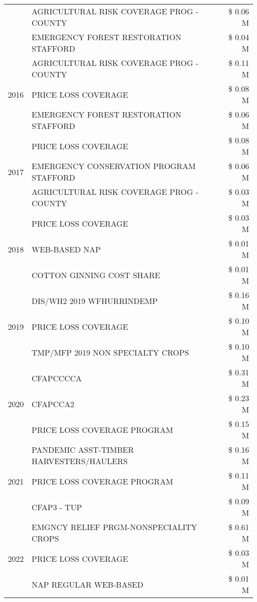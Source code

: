 \begin{tabular}{llr}
 & AGRICULTURAL RISK COVERAGE PROG - COUNTY & \$ 0.06 M \\
 & EMERGENCY FOREST RESTORATION STAFFORD & \$ 0.04 M \\
\cline{1-3}
\multirow[t]{3}{*}{2016} & AGRICULTURAL RISK COVERAGE PROG - COUNTY & \$ 0.11 M \\
 & PRICE LOSS COVERAGE & \$ 0.08 M \\
 & EMERGENCY FOREST RESTORATION STAFFORD & \$ 0.06 M \\
\cline{1-3}
\multirow[t]{3}{*}{2017} & PRICE LOSS COVERAGE & \$ 0.08 M \\
 & EMERGENCY CONSERVATION PROGRAM STAFFORD & \$ 0.06 M \\
 & AGRICULTURAL RISK COVERAGE PROG - COUNTY & \$ 0.03 M \\
\cline{1-3}
\multirow[t]{3}{*}{2018} & PRICE LOSS COVERAGE & \$ 0.03 M \\
 & WEB-BASED NAP & \$ 0.01 M \\
 & COTTON GINNING COST SHARE & \$ 0.01 M \\
\cline{1-3}
\multirow[t]{3}{*}{2019} & DIS/WH2 2019 WFHURRINDEMP & \$ 0.16 M \\
 & PRICE LOSS COVERAGE & \$ 0.10 M \\
 & TMP/MFP 2019 NON SPECIALTY CROPS & \$ 0.10 M \\
\cline{1-3}
\multirow[t]{3}{*}{2020} & CFAPCCCCA & \$ 0.31 M \\
 & CFAPCCA2 & \$ 0.23 M \\
 & PRICE LOSS COVERAGE PROGRAM & \$ 0.15 M \\
\cline{1-3}
\multirow[t]{3}{*}{2021} & PANDEMIC ASST-TIMBER HARVESTERS/HAULERS & \$ 0.16 M \\
 & PRICE LOSS COVERAGE PROGRAM & \$ 0.11 M \\
 & CFAP3 - TUP & \$ 0.09 M \\
\cline{1-3}
\multirow[t]{3}{*}{2022} & EMGNCY RELIEF PRGM-NONSPECIALITY CROPS & \$ 0.61 M \\
 & PRICE LOSS COVERAGE & \$ 0.03 M \\
 & NAP REGULAR WEB-BASED & \$ 0.01 M \\
\cline{1-3}
\bottomrule
\end{tabular}
